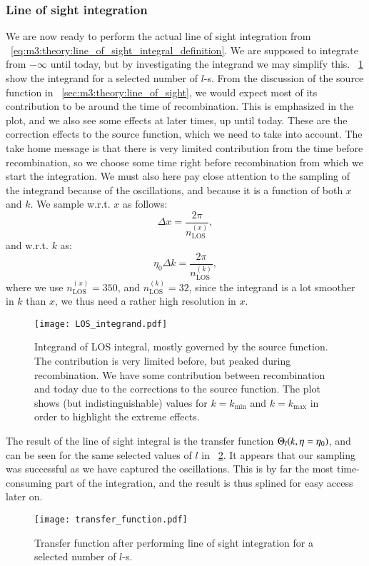     \subsubsection{Line of sight integration}
        We are now ready to perform the actual line of sight integration from ~\cref{eq:m3:theory:line_of_sight_integral_definition}. We are supposed to integrate from $-\infty$ until today, but by investigating the integrand we may simplify this. ~\cref{fig:m4:LOS_integrand} show the integrand for a selected number of $l$-s. From the discussion of the source function in ~\cref{sec:m3:theory:line_of_sight}, we would expect most of its contribution to be around the time of recombination. This is emphasized in the plot, and we also see some effects at later times, up until today. These are the correction effects to the source function, which we need to take into account. The take home message is that there is very limited contribution from the time before recombination, so we choose some time right before recombination from which we start the integration. We must also here pay close attention to the sampling of the integrand because of the oscillations, and because it is a function of both $x$ and $k$. We sample w.r.t. $x$ as follows:
        \begin{equation}
            \Delta x = \frac{2\pi}{n_\mathrm{LOS}^{(x)}},
        \end{equation}
        and w.r.t. $k$ as:
        \begin{equation}
            \eta_0\Delta k = \frac{2\pi}{n_\mathrm{LOS}^{(k)}},
        \end{equation}
        where we use $n_\mathrm{LOS}^{(x)}=350$, and $n_\mathrm{LOS}^{(k)}=32$, since the integrand is a lot smoother in $k$ than $x$, we thus need a rather high resolution in $x$. 

        \begin{figure}
            \texttt{[image: LOS\_integrand.pdf]}
            \caption{Integrand of LOS integral, mostly governed by the source function. The contribution is very limited before, but peaked during recombination. We have some contribution between recombination and today due to the corrections to the source function. The plot shows (but indistinguishable) values for $k=k_\mathrm{min}$ and $k=k_\mathrm{max}$ in order to highlight the extreme effects.}
            \label{fig:m4:LOS_integrand}
        \end{figure}

        The result of the line of sight integral is the transfer function $\Theta_l(k, \eta=\eta_0)$, and can be seen for the same selected values of $l$ in ~\cref{fig:m4:transfer_function}. It appears that our sampling was successful as we have captured the oscillations. This is by far the most time-consuming part of the integration, and the result is thus splined for easy access later on. 
        \begin{figure}
            \texttt{[image: transfer\_function.pdf]}
            \caption{Transfer function after performing line of sight integration for a selected number of $l$-s. }
            \label{fig:m4:transfer_function}
        \end{figure}
